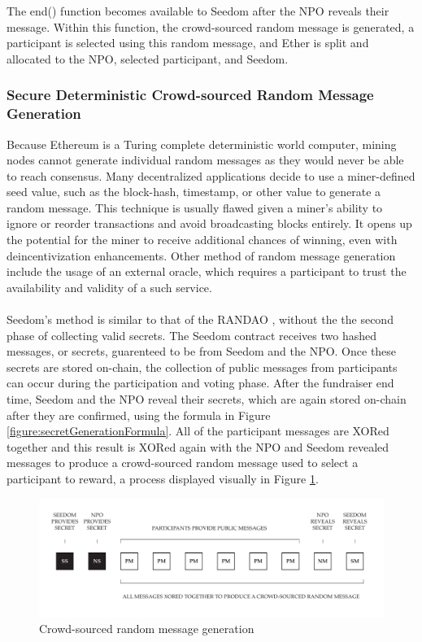 \documentclass[11pt]{article}
\begin{document}
The end() function becomes available to Seedom after the NPO reveals their message. Within this function, the crowd-sourced random message is generated, a participant is selected using this random message, and Ether is split and allocated to the NPO, selected participant, and Seedom.

\subsubsection{Secure Deterministic Crowd-sourced Random Message Generation}
\label{sec:secureDeterministicCrowdSourcedRandomMessageGeneration}

Because Ethereum is a Turing complete deterministic world computer, mining nodes cannot generate individual random messages as they would never be able to reach consensus. Many decentralized applications decide to use a miner-defined seed value, such as the block-hash, timestamp, or other value to generate a random message. This technique is usually flawed given a miner's ability to ignore or reorder transactions and avoid broadcasting blocks entirely. It opens up the potential for the miner to receive additional chances of winning, even with deincentivization enhancements. Other method of random message generation include the usage of an external oracle, which requires a participant to trust the availability and validity of a such service.\\\\
Seedom's method is similar to that of the RANDAO \cite{2}, without the the second phase of collecting valid secrets. The Seedom contract receives two hashed messages, or secrets, guarenteed to be from Seedom and the NPO. Once these secrets are stored on-chain, the collection of public messages from participants can occur during the participation and voting phase. After the fundraiser end time, Seedom and the NPO reveal their secrets, which are again stored on-chain after they are confirmed, using the formula in Figure \ref{figure:secretGenerationFormula}. All of the participant messages are XORed together and this result is XORed again with the NPO and Seedom revealed messages to produce a crowd-sourced random message used to select a participant to reward, a process displayed visually in Figure \ref{figure:crowdsourcedRandomMessageGeneration}.

\begin{figure}[H]
\begin{center}
\includegraphics[width=1.0\textwidth]{./graphics/crowd-sourced-random-message-generation.pdf}
\caption{Crowd-sourced random message generation}
\label{figure:crowdsourcedRandomMessageGeneration}
\end{center}
\end{figure}
\end{document}
